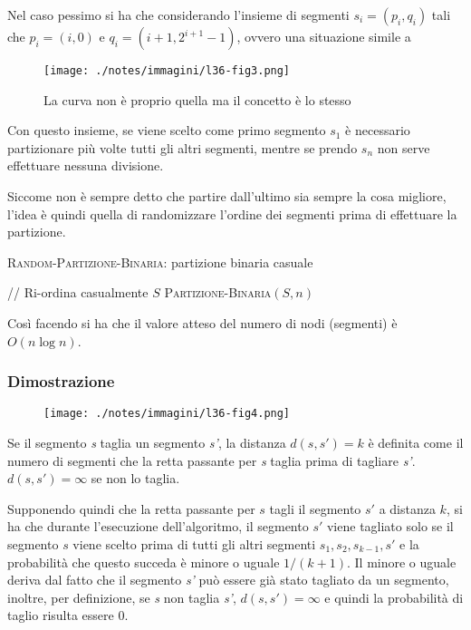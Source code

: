 Nel caso pessimo si ha che considerando l'insieme di segmenti $s_i = (p_i, q_i)$ tali che $p_i = (i,0)$ e $q_i = (i+1, 2^{i+1}-1)$, ovvero una situazione simile a

\begin{figure}[htbp]
\centering
\texttt{[image: ./notes/immagini/l36-fig3.png]}
\caption{La curva non è proprio quella ma il concetto è lo stesso}
\end{figure}

Con questo insieme, se viene scelto come primo segmento $s_1$ è necessario partizionare più volte tutti gli altri segmenti, mentre se
prendo $s_n$ non serve effettuare nessuna divisione.

Siccome non è sempre detto che partire dall'ultimo sia sempre la cosa migliore, l'idea è quindi quella di randomizzare l'ordine dei segmenti
prima di effettuare la partizione.

\begin{breakablealgorithm}
	\caption{\textsc{Random-Partizione-Binaria}: partizione binaria casuale}
	\begin{algorithmic}[1]
	    \State // Ri-ordina casualmente $S$
	    \State \Return \textsc{Partizione-Binaria}$(S,n)$
	\EndFunction
\end{algorithmic}
\end{breakablealgorithm}

Così facendo si ha che il valore atteso del numero di nodi (segmenti) è $O(n \log n)$.

\subsubsection{Dimostrazione}\label{dimostrazione}

\begin{figure}[htbp]
\centering
\texttt{[image: ./notes/immagini/l36-fig4.png]}
\end{figure}

Se il segmento \emph{s} taglia un segmento \emph{s'}, la distanza $d(s,s') = k$ è definita come il numero di segmenti che la retta passante per \emph{s} taglia prima di tagliare \emph{s'}. $d(s,s')=\infty$ se non lo taglia.

Supponendo quindi che la retta passante per $s$ tagli il segmento $s'$ a distanza $k$, si ha che durante l'esecuzione dell'algoritmo, il segmento $s'$ viene tagliato solo se il segmento $s$ viene scelto prima di tutti gli altri segmenti $s_1, s_2, s_{k-1}, s'$ e la probabilità che questo succeda è minore o uguale $1/(k+1)$. 
Il minore o uguale deriva dal fatto che il segmento \emph{s'} può essere già stato tagliato da un segmento, inoltre, per definizione, se \emph{s} non taglia \emph{s'}, $d(s,s') = \infty$ e quindi la probabilità di taglio risulta essere 0.

